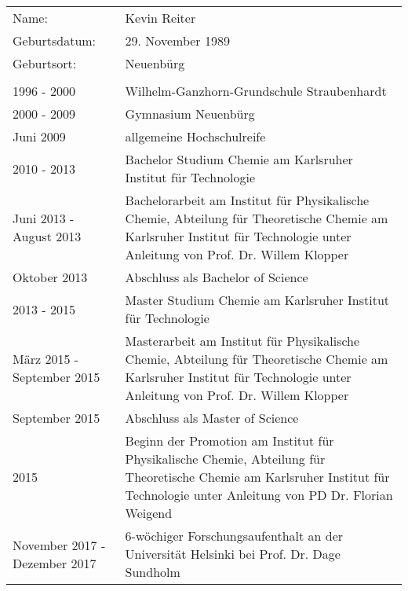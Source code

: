 \renewcommand{\arraystretch}{1.7}
\begin{singlespace}
\begin{tabular}{lp{7.6cm}}
Name: & Kevin Reiter \\ 

Geburtsdatum: & 29. November 1989 \\ 

Geburtsort: & Neuenbürg \\ 

\quad & \quad \\

1996 - 2000 & Wilhelm-Ganzhorn-Grundschule Straubenhardt \\ 

2000 - 2009 & Gymnasium Neuenbürg \\ 

Juni 2009 & allgemeine Hochschulreife \\ 

2010 - 2013 & Bachelor Studium Chemie am Karlsruher Institut für Technologie  \\ 
Juni 2013 - August 2013  & Bachelorarbeit am Institut für Physikalische Chemie, Abteilung für Theoretische Chemie am Karlsruher Institut für Technologie unter Anleitung von Prof. Dr. Willem Klopper \\

Oktober 2013 & Abschluss als Bachelor of Science \\ 
 
2013 - 2015 & Master Studium Chemie am Karlsruher Institut für Technologie \\ 

März 2015 - September 2015  & Masterarbeit am Institut für Physikalische Chemie, Abteilung für Theoretische Chemie am Karlsruher Institut für Technologie unter Anleitung von Prof. Dr. Willem Klopper \\

September 2015 & Abschluss als Master of Science \\ 

2015 & Beginn der Promotion am Institut für Physikalische Chemie, Abteilung für Theoretische Chemie am Karlsruher Institut für Technologie unter Anleitung von PD Dr. Florian Weigend \\ 

November 2017 - Dezember 2017 & 6-wöchiger Forschungsaufenthalt an der Universität Helsinki bei Prof. Dr. Dage Sundholm \\ 
\end{tabular}  
\end{singlespace}
\enlargethispage{13.5pt}
\vfill